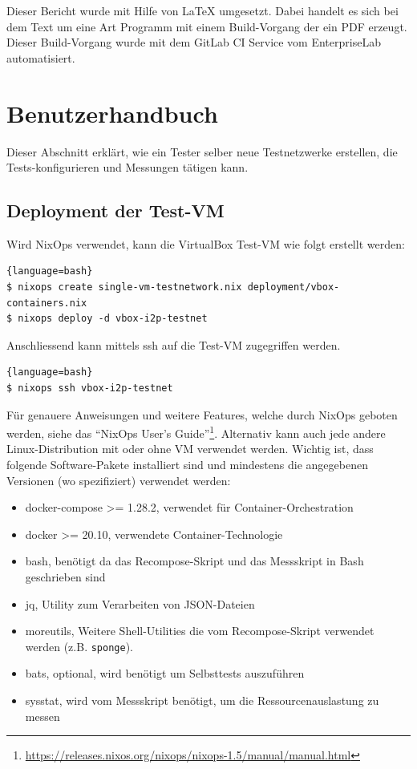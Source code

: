 Dieser Bericht wurde mit Hilfe von LaTeX umgesetzt.
Dabei handelt es sich bei dem Text um eine Art Programm mit einem Build-Vorgang der ein PDF erzeugt.
Dieser Build-Vorgang wurde mit dem GitLab CI Service vom EnterpriseLab automatisiert.

\section{Benutzerhandbuch}

Dieser Abschnitt erklärt, wie ein Tester selber neue Testnetzwerke erstellen, die Tests-konfigurieren und Messungen tätigen kann.

\subsection{Deployment der Test-VM}

Wird NixOps verwendet, kann die VirtualBox Test-VM wie folgt erstellt werden:

\begin{lstlisting}[numbers=none]{language=bash}
$ nixops create single-vm-testnetwork.nix deployment/vbox-containers.nix
$ nixops deploy -d vbox-i2p-testnet
\end{lstlisting}

Anschliessend kann mittels ssh auf die Test-VM zugegriffen werden.

\begin{lstlisting}[numbers=none]{language=bash}
$ nixops ssh vbox-i2p-testnet
\end{lstlisting}

Für genauere Anweisungen und weitere Features, welche durch NixOps geboten werden, siehe das ``NixOps User's Guide''\footnote{\url{https://releases.nixos.org/nixops/nixops-1.5/manual/manual.html}}.
Alternativ kann auch jede andere Linux-Distribution mit oder ohne VM verwendet werden.
Wichtig ist, dass folgende Software-Pakete installiert sind und mindestens die angegebenen Versionen (wo spezifiziert) verwendet werden:

\begin{itemize}
    \item docker-compose >= 1.28.2, verwendet für Container-Orchestration
    \item docker >= 20.10, verwendete Container-Technologie
    \item bash, benötigt da das Recompose-Skript und das Messskript in Bash geschrieben sind
    \item jq, Utility zum Verarbeiten von JSON-Dateien
    \item moreutils, Weitere Shell-Utilities die vom Recompose-Skript verwendet werden (z.B. \lstinline|sponge|).
    \item bats, optional, wird benötigt um Selbsttests auszuführen
    \item sysstat, wird vom Messskript benötigt, um die Ressourcenauslastung zu messen
\end{itemize}


